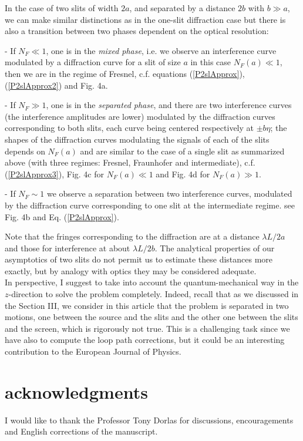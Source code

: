 \documentclass[12pt]{article}   %
\begin{document}
In the case of two slits of width $ 2a $, and separated by a
distance $2b$ with $ b\gg a $, we can make similar distinctions as
in the one-slit diffraction case but there is also a transition
between two phases dependent on the optical resolution:

- If $N_F\ll 1$, one is in the \textit{mixed
phase}, i.e. we observe an interference curve modulated by a
diffraction curve for a slit of size $ a $ in this case $ N_F(a)
\ll 1$, then we are in the regime of Fresnel, c.f. equations
(\ref{P2slApprox}), (\ref{P2slApprox2}) and Fig. 4a.

- If $N_F\gg 1$, one is in the
\textit{separated phase}, and there are two interference curves
(the interference amplitudes are lower) modulated by the
diffraction curves corresponding to both slits, each curve being
centered respectively at $ \pm b\eta $; the shapes of the
diffraction curves modulating the signals of each of the slits
depends on $ N_F(a) $ and are similar to the case of a single slit
as summarized above (with three regimes: Fresnel, Fraunhofer and
intermediate), c.f. (\ref{P2slApprox3}), Fig. 4c for $N_F(a)\ll1$ 
and Fig. 4d for $N_F(a)\gg1$.

 - If $N_F \sim 1$ we observe a separation between two interference curves,
modulated by the diffraction curve corresponding to one slit at the intermediate regime.
see Fig. 4b and Eq. (\ref{P2slApprox}).  

Note that the fringes corresponding to the diffraction are at a
distance $\lambda L/2a$ and those for interference at about
$\lambda L/2b$. The analytical properties of our asymptotics of
two slits do not permit us to estimate these distances more
exactly, but
by analogy with optics they may be considered adequate. \\

In perspective, I suggest to take into account the quantum-mechanical way 
in the $z$-direction to solve the problem completely.
Indeed, recall that as we discussed in the Section III,
we consider in this article that the problem is separated
in two motions, one between the source and the slits 
and the other one between the slits and the screen,
which is rigorously not true. 
This is a challenging task
since we have also to compute the loop path corrections,\cite{Yabuki} 
but it could be an interesting contribution to the European Journal of Physics. 



\section*{acknowledgments}
I would like to thank the Professor Tony Dorlas 
for discussions, encouragements and English corrections of the manuscript.
\end{document}
